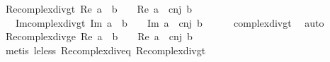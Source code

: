 \begin{isabellebody}
\isamarkupfalse%
%
\endisatagproof
{\isafoldproof}%
%
\isadelimproof
\isanewline
%
\endisadelimproof
\isanewline
{}\isamarkupfalse%
\ Re{\isacharunderscore}{\kern0pt}complex{\isacharunderscore}{\kern0pt}div{\isacharunderscore}{\kern0pt}gt{\isacharunderscore}{\kern0pt}{}{\isacharcolon}{\kern0pt}\ {\isachardoublequoteopen}Re\ {\isacharparenleft}{\kern0pt}a\ {\isacharslash}{\kern0pt}\ b{\isacharparenright}{\kern0pt}\ {\isachargreater}{\kern0pt}\ {}\ {\isasymlongleftrightarrow}\ Re\ {\isacharparenleft}{\kern0pt}a\ {\isacharasterisk}{\kern0pt}\ cnj\ b{\isacharparenright}{\kern0pt}\ {\isachargreater}{\kern0pt}\ {}{\isachardoublequoteclose}\isanewline
\ \ \ Im{\isacharunderscore}{\kern0pt}complex{\isacharunderscore}{\kern0pt}div{\isacharunderscore}{\kern0pt}gt{\isacharunderscore}{\kern0pt}{}{\isacharcolon}{\kern0pt}\ {\isachardoublequoteopen}Im\ {\isacharparenleft}{\kern0pt}a\ {\isacharslash}{\kern0pt}\ b{\isacharparenright}{\kern0pt}\ {\isachargreater}{\kern0pt}\ {}\ {\isasymlongleftrightarrow}\ Im\ {\isacharparenleft}{\kern0pt}a\ {\isacharasterisk}{\kern0pt}\ cnj\ b{\isacharparenright}{\kern0pt}\ {\isachargreater}{\kern0pt}\ {}{\isachardoublequoteclose}\isanewline
%
\isadelimproof
\ \ %
\endisadelimproof
%
\isatagproof
{}\isamarkupfalse%
\ complex{\isacharunderscore}{\kern0pt}div{\isacharunderscore}{\kern0pt}gt{\isacharunderscore}{\kern0pt}{}\ \isamarkupfalse%
\ auto%
\endisatagproof
{\isafoldproof}%
%
\isadelimproof
\isanewline
%
\endisadelimproof
\isanewline
{}\isamarkupfalse%
\ Re{\isacharunderscore}{\kern0pt}complex{\isacharunderscore}{\kern0pt}div{\isacharunderscore}{\kern0pt}ge{\isacharunderscore}{\kern0pt}{}{\isacharcolon}{\kern0pt}\ {\isachardoublequoteopen}Re\ {\isacharparenleft}{\kern0pt}a\ {\isacharslash}{\kern0pt}\ b{\isacharparenright}{\kern0pt}\ {\isasymge}\ {}\ {\isasymlongleftrightarrow}\ Re\ {\isacharparenleft}{\kern0pt}a\ {\isacharasterisk}{\kern0pt}\ cnj\ b{\isacharparenright}{\kern0pt}\ {\isasymge}\ {}{\isachardoublequoteclose}\isanewline
%
\isadelimproof
\ \ %
\endisadelimproof
%
\isatagproof
{}\isamarkupfalse%
\ {\isacharparenleft}{\kern0pt}metis\ le{\isacharunderscore}{\kern0pt}less\ Re{\isacharunderscore}{\kern0pt}complex{\isacharunderscore}{\kern0pt}div{\isacharunderscore}{\kern0pt}eq{\isacharunderscore}{\kern0pt}{}\ Re{\isacharunderscore}{\kern0pt}complex{\isacharunderscore}{\kern0pt}div{\isacharunderscore}{\kern0pt}gt{\isacharunderscore}{\kern0pt}{}{\isacharparenright}{\kern0pt}%

\end{isabellebody}
